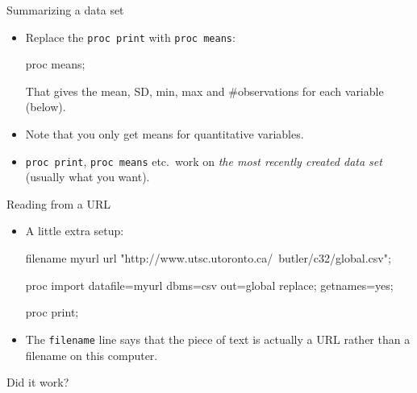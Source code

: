 \documentclass[unknownkeysallowed]{beamer}\usepackage[]{graphicx}\usepackage[]{color}
\begin{document}
\begin{frame}[fragile]{Summarizing a data set}
  
  \begin{itemize}
  \item Replace the \texttt{proc print} with \texttt{proc means}:
    
    \begin{Sascode}[store=rb]
proc means;      
    \end{Sascode}
    
    That gives the mean, SD, min, max and \#observations for each
    variable (below).
    
    \item Note that you only get means for quantitative variables.
    \item \texttt{proc print}, \texttt{proc means} etc.\ work on
      \emph{the most recently created data set} (usually what you
      want). 
    


  \end{itemize}
  
\end{frame}

\begin{frame}[fragile]{Reading from a URL}
  
  \begin{itemize}
  \item A little extra setup:
    
    \begin{small}
    \begin{Sascode}[store=ua]
filename myurl 
  url 
  "http://www.utsc.utoronto.ca/~butler/c32/global.csv";

proc import 
  datafile=myurl 
  dbms=csv
  out=global
  replace;
  getnames=yes;
  
proc print;
    \end{Sascode}
      
    \end{small}
    
    
  \item The \texttt{filename} line says that the piece of text is
    actually a URL rather than a filename on this computer.
  \end{itemize}
  
\end{frame}

\begin{frame}[fragile]{Did it work?}
  
  
\end{frame}
\end{document}
